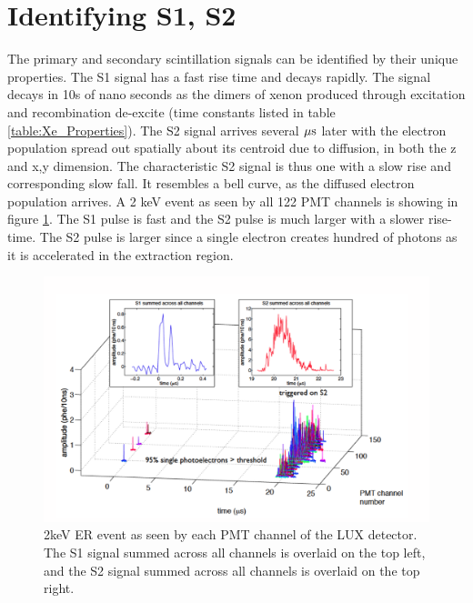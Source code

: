 \section{Identifying S1, S2}
The primary and secondary scintillation signals can be identified by their unique properties. The S1 signal has a fast rise time and decays rapidly.  The signal decays in 10s of nano seconds as the dimers of xenon produced through excitation and recombination de-excite (time constants listed in table \ref{table:Xe_Properties}). The S2 signal arrives several $\rm \mu s$ later with the electron population spread out spatially about its centroid due to diffusion, in both the z and x,y dimension. The characteristic S2 signal is thus one with a slow rise and corresponding slow fall. It resembles a bell curve, as the diffused electron population arrives. A 2 keV event as seen by all 122 PMT channels is showing in figure \ref{fig:LUX_Golden}. The S1 pulse is fast and the S2 pulse is much larger with a slower rise-time.  The S2 pulse is larger since a single electron creates hundred of photons as it is accelerated in the extraction region. 


 \begin{figure}[h!]\centering
\includegraphics[width=130mm]{Chapter_LUX_Det/LUX_Golden_Event_2keV.png}
\caption{ 2keV ER event as seen by each PMT channel of the LUX detector. The S1 signal summed across all channels is overlaid on the top left, and the S2 signal summed across all channels is overlaid on the top right.}
\label{fig:LUX_Golden}
\end{figure}

